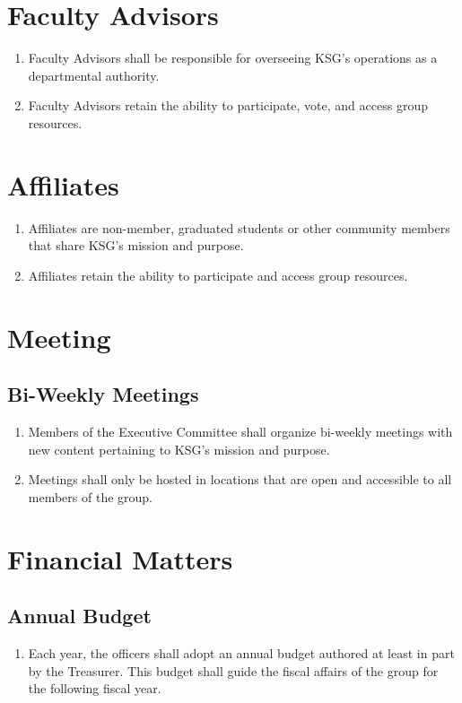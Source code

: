 \documentclass[12pt,executivepaper]{article}
\begin{document}
\section{Faculty Advisors}
\begin{enumerate}
    \item Faculty Advisors shall be responsible for overseeing KSG's operations as
          a departmental authority.
    \item Faculty Advisors retain the ability to participate, vote, and access group
          resources.
\end{enumerate}

\section{Affiliates}
\begin{enumerate}
    \item Affiliates are non-member, graduated students or other community members
          that share KSG's mission and purpose.
    \item Affiliates retain the ability to participate and access group resources.
\end{enumerate}

\section{Meeting}

\subsection{Bi-Weekly Meetings}
\begin{enumerate}
    \item Members of the Executive Committee shall organize bi-weekly meetings with
          new content pertaining to KSG's mission and purpose.
    \item Meetings shall only be hosted in locations that are open and accessible
          to all members of the group.
\end{enumerate}

\section{Financial Matters}

\subsection{Annual Budget}
\begin{enumerate}
    \item Each year, the officers shall adopt an annual budget authored at least in
          part by the Treasurer. This budget shall guide the fiscal affairs of the
          group for the following fiscal year.
\end{enumerate}
\end{document}

